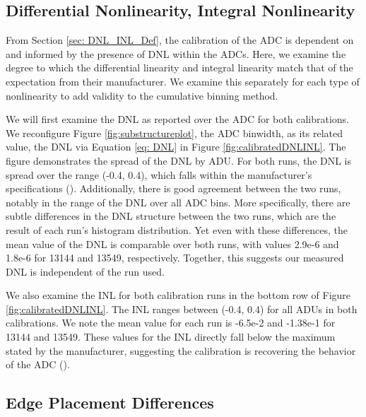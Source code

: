\documentclass[linenumbers]{aastex7}
\begin{document}
\subsection{Differential Nonlinearity, Integral Nonlinearity}
\label{sec:resultDNLINL}


From Section \ref{sec: DNL_INL_Def}, the calibration of the ADC is dependent on and informed by the presence of DNL within the ADCs. 
Here, we examine the degree to which the differential linearity and integral linearity match that of the expectation from their manufacturer. 
We examine this separately for each type of nonlinearity to add validity to the cumulative binning method.

We will first examine the DNL as reported over the ADC for both calibrations. 
We reconfigure Figure \ref{fig:substructureplot}, the ADC binwidth, as its related value, the DNL via Equation \ref{eq: DNL} in Figure \ref{fig:calibratedDNLINL}. 
The figure demonstrates the spread of the DNL by ADU. 
For both runs, the DNL is spread over the range (-0.4, 0.4), which falls within the manufacturer's specifications (\cite{AnalogDevices}). 
Additionally, there is good agreement between the two runs, notably in the range of the DNL over all ADC bins. 
More specifically, there are subtle differences in the DNL structure between the two runs, which are the result of each run’s histogram distribution. 
Yet even with these differences, the mean value of the DNL is comparable over both runs, with values 2.9e-6 and 1.8e-6 for 13144 and 13549, respectively.
Together, this suggests our measured DNL is independent of the run used. 

We also examine the INL for both calibration runs in the bottom row of Figure \ref{fig:calibratedDNLINL}.
The INL ranges between (-0.4, 0.4) for all ADUs in both calibrations. 
We note the mean value for each run is -6.5e-2 and -1.38e-1 for 13144 and 13549. 
These values for the INL directly fall below the maximum stated by the manufacturer, suggesting the calibration is recovering the behavior of the ADC (\cite{AnalogDevices}).

\subsection{Edge Placement Differences}
\label{sec:Left Differences}
\end{document}
